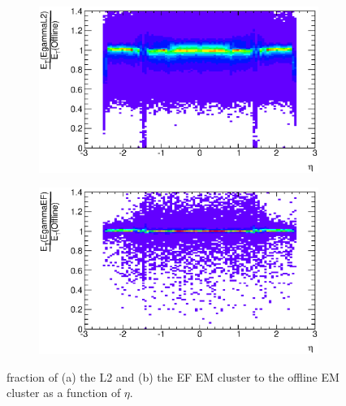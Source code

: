 \begin{figure}
\centering
        \begin{subfigure}[b]{0.5\textwidth}
                \centering
                \includegraphics[width=\textwidth]{figures/ServiceWork/run_190644/EtFrac_Eta_Matched_L2.eps}
        \end{subfigure}%
        \begin{subfigure}[b]{0.5\textwidth}
                \centering
                \includegraphics[width=\textwidth]{figures/ServiceWork/run_190644/EtFrac_Eta_Matched_EF.eps}
        \end{subfigure}%
\caption[\et{} fraction of L2 and EF to offline EM objects]{
\et{} fraction of (a) the  L2 and (b) the EF EM cluster  to the offline EM cluster \et{} as a function of $\eta$. 
\label{SW_egamma_L2EF_EtFrac}}
\end{figure}

